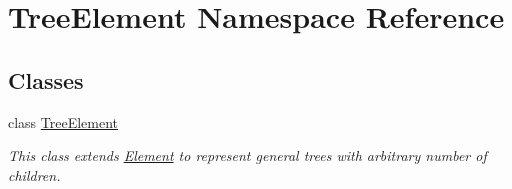 \hypertarget{namespace_tree_element}{}\section{Tree\+Element Namespace Reference}
\label{namespace_tree_element}
\subsection*{Classes}
\begin{DoxyCompactItemize}
\item 
class \hyperlink{class_tree_element_1_1_tree_element}{Tree\+Element}
\begin{DoxyCompactList}\small\item\em This class extends \hyperlink{namespace_element}{Element} to represent general trees with arbitrary number of children. \end{DoxyCompactList}\end{DoxyCompactItemize}
